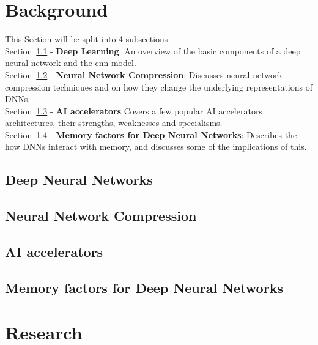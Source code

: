 \documentclass[11pt]{article}
\begin{document}
\pagebreak
\section{Background}
This Section will be split into 4 subsections:\\
Section~\ref{subsec:deepLearning} - \textbf{Deep Learning}: An overview of the basic components of a deep neural network and the \acrshort{cnn} model.\\
Section~\ref{subsec:compressionTypes} - \textbf{Neural Network Compression}: Discusses neural network compression techniques and on how they change the underlying representations of DNNs.\\
Section~\ref{subsec:AIaccelerators} - \textbf{AI accelerators} Covers a few popular AI accelerators architectures, their strengths, weaknesses and specialisms.\\
Section~\ref{subsec:hardwareArch} - \textbf{Memory factors for Deep Neural Networks}: Describes the how DNNs interact with memory, and discusses some of the implications of this.

\subsection{Deep Neural Networks}\label{subsec:deepLearning}


\newpage
\subsection{Neural Network Compression}\label{subsec:compressionTypes}


\newpage
\subsection{AI accelerators}\label{subsec:AIaccelerators}


\newpage
\subsection{Memory factors for Deep Neural Networks}\label{subsec:hardwareArch}


\newpage
\section{Research}

\end{document}
